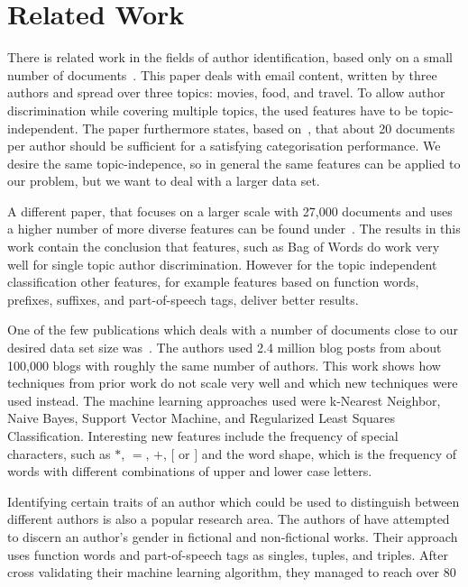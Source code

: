 
\section{Related Work}
\label{sec:related}
There is related work in the fields of author identification, based only on a small number of documents~\cite{de2001mining}.
This paper deals with email content, written by three authors and spread over three topics: movies, food, and travel.
To allow author discrimination while covering multiple topics, the used features have to be topic-independent.
The paper furthermore states, based on~\cite{corney2001identifying}, that about 20 documents per author should be sufficient for a satisfying categorisation performance.
We desire the same topic-indepence, so in general the same features can be applied to our problem, but we want to deal with a larger data set.


A different paper, that focuses on a larger scale with 27,000 documents and uses a higher number of more diverse features can be found under~\cite{madigan2005author}.
The results in this work contain the conclusion that features, such as Bag of Words do work very well for single topic author discrimination.
However for the topic independent classification other features, for example features based on function words, prefixes, suffixes, and part-of-speech tags, deliver better results.


One of the few publications which deals with a number of documents close to our desired data set size was~\cite{narayanan2012feasibility}.
The authors used 2.4 million blog posts from about 100,000 blogs with roughly the same number of authors.
This work shows how techniques from prior work do not scale very well and which new techniques were used instead.
The machine learning approaches used were k-Nearest Neighbor, Naive Bayes, Support Vector Machine, and Regularized Least Squares Classification.
Interesting new features include the frequency of special characters, such as $*$, $=$, $+$, $[$ or $]$ and the word shape, which is the frequency of words with different combinations of upper and lower case letters.


Identifying certain traits of an author which could be used to distinguish between different authors is also a popular research area.
The authors of \cite{koppel2003automatically} have attempted to discern an author's gender in fictional and non-fictional works.
Their approach uses function words and part-of-speech tags as singles, tuples, and triples.
After cross validating their machine learning algorithm, they managed to reach over 80%
